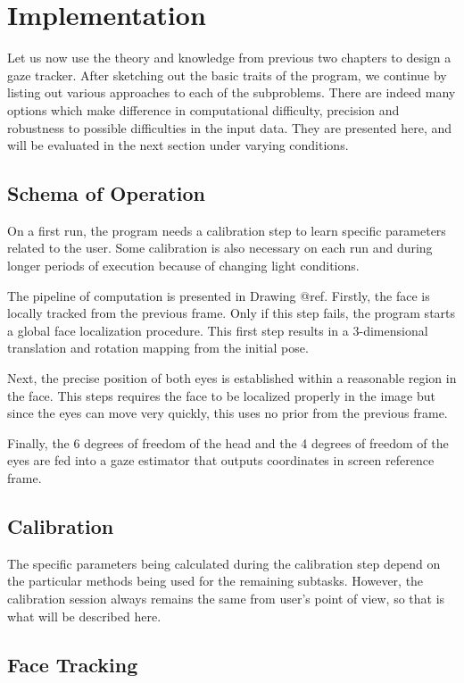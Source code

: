 \chapter{Implementation}

Let us now use the theory and knowledge from previous two chapters to design a gaze tracker.
After sketching out the basic traits of the program, we continue by listing out various approaches to each of the subproblems.
There are indeed many options which make difference in computational difficulty, precision and robustness to possible difficulties in the input data.
They are presented here, and will be evaluated in the next section under varying conditions.

\section{Schema of Operation}

On a first run, the program needs a calibration step to learn specific parameters related to the user.
Some calibration is also necessary on each run and during longer periods of execution because of changing light conditions.

The pipeline of computation is presented in Drawing @ref.
Firstly, the face is locally tracked from the previous frame.
Only if this step fails, the program starts a global face localization procedure.
This first step results in a 3-dimensional translation and rotation mapping from the initial pose.

Next, the precise position of both eyes is established within a reasonable region in the face.
This steps requires the face to be localized properly in the image but since the eyes can move very quickly, this uses no prior from the previous frame.

Finally, the 6 degrees of freedom of the head and the 4 degrees of freedom of the eyes are fed into a gaze estimator that outputs coordinates in screen reference frame.

\section{Calibration}

The specific parameters being calculated during the calibration step depend on the particular methods being used for the remaining subtasks.
However, the calibration session always remains the same from user's point of view, so that is what will be described here.

\section{Face Tracking}

